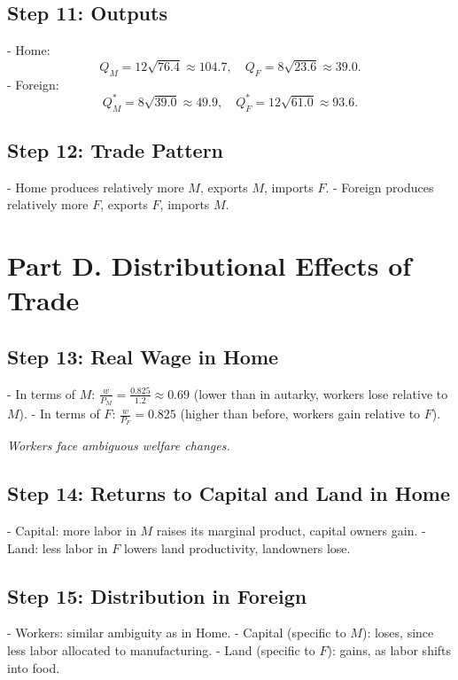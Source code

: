\documentclass[12pt]{article}
\begin{document}
\subsection*{Step 11: Outputs}
- Home: 
\[
Q_M = 12\sqrt{76.4} \approx 104.7, 
\quad 
Q_F = 8\sqrt{23.6} \approx 39.0.
\]
- Foreign: 
\[
Q_M^{*} = 8\sqrt{39.0} \approx 49.9, 
\quad 
Q_F^{*} = 12\sqrt{61.0} \approx 93.6.
\]

\subsection*{Step 12: Trade Pattern}
- Home produces relatively more $M$, exports $M$, imports $F$.  
- Foreign produces relatively more $F$, exports $F$, imports $M$.  

\bigskip

\section*{Part D. Distributional Effects of Trade}

\subsection*{Step 13: Real Wage in Home}
- In terms of $M$: $\tfrac{w}{P_M} = \tfrac{0.825}{1.2} \approx 0.69$ (lower than in autarky, workers lose relative to $M$).  
- In terms of $F$: $\tfrac{w}{P_F} = 0.825$ (higher than before, workers gain relative to $F$).  

\textit{Workers face ambiguous welfare changes.}

\subsection*{Step 14: Returns to Capital and Land in Home}
- Capital: more labor in $M$ raises its marginal product, capital owners gain.  
- Land: less labor in $F$ lowers land productivity, landowners lose.  

\subsection*{Step 15: Distribution in Foreign}
- Workers: similar ambiguity as in Home.  
- Capital (specific to $M$): loses, since less labor allocated to manufacturing.  
- Land (specific to $F$): gains, as labor shifts into food.  

\bigskip
\end{document}
